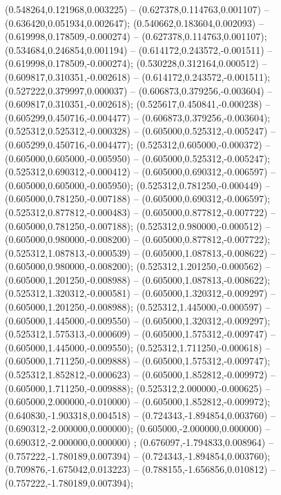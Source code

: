  (0.548264,0.121968,0.003225) -- (0.627378,0.114763,0.001107) -- (0.636420,0.051934,0.002647);
 (0.540662,0.183604,0.002093) -- (0.619998,0.178509,-0.000274) -- (0.627378,0.114763,0.001107);
 (0.534684,0.246854,0.001194) -- (0.614172,0.243572,-0.001511) -- (0.619998,0.178509,-0.000274);
 (0.530228,0.312164,0.000512) -- (0.609817,0.310351,-0.002618) -- (0.614172,0.243572,-0.001511);
 (0.527222,0.379997,0.000037) -- (0.606873,0.379256,-0.003604) -- (0.609817,0.310351,-0.002618);
 (0.525617,0.450841,-0.000238) -- (0.605299,0.450716,-0.004477) -- (0.606873,0.379256,-0.003604);
 (0.525312,0.525312,-0.000328) -- (0.605000,0.525312,-0.005247) -- (0.605299,0.450716,-0.004477);
 (0.525312,0.605000,-0.000372) -- (0.605000,0.605000,-0.005950) -- (0.605000,0.525312,-0.005247);
 (0.525312,0.690312,-0.000412) -- (0.605000,0.690312,-0.006597) -- (0.605000,0.605000,-0.005950);
 (0.525312,0.781250,-0.000449) -- (0.605000,0.781250,-0.007188) -- (0.605000,0.690312,-0.006597);
 (0.525312,0.877812,-0.000483) -- (0.605000,0.877812,-0.007722) -- (0.605000,0.781250,-0.007188);
 (0.525312,0.980000,-0.000512) -- (0.605000,0.980000,-0.008200) -- (0.605000,0.877812,-0.007722);
 (0.525312,1.087813,-0.000539) -- (0.605000,1.087813,-0.008622) -- (0.605000,0.980000,-0.008200);
 (0.525312,1.201250,-0.000562) -- (0.605000,1.201250,-0.008988) -- (0.605000,1.087813,-0.008622);
 (0.525312,1.320312,-0.000581) -- (0.605000,1.320312,-0.009297) -- (0.605000,1.201250,-0.008988);
 (0.525312,1.445000,-0.000597) -- (0.605000,1.445000,-0.009550) -- (0.605000,1.320312,-0.009297);
 (0.525312,1.575313,-0.000609) -- (0.605000,1.575312,-0.009747) -- (0.605000,1.445000,-0.009550);
 (0.525312,1.711250,-0.000618) -- (0.605000,1.711250,-0.009888) -- (0.605000,1.575312,-0.009747);
 (0.525312,1.852812,-0.000623) -- (0.605000,1.852812,-0.009972) -- (0.605000,1.711250,-0.009888);
 (0.525312,2.000000,-0.000625) -- (0.605000,2.000000,-0.010000) -- (0.605000,1.852812,-0.009972);
 (0.640830,-1.903318,0.004518) -- (0.724343,-1.894854,0.003760) -- (0.690312,-2.000000,0.000000);
 (0.605000,-2.000000,0.000000) -- (0.690312,-2.000000,0.000000) ;
 (0.676097,-1.794833,0.008964) -- (0.757222,-1.780189,0.007394) -- (0.724343,-1.894854,0.003760);
 (0.709876,-1.675042,0.013223) -- (0.788155,-1.656856,0.010812) -- (0.757222,-1.780189,0.007394);
